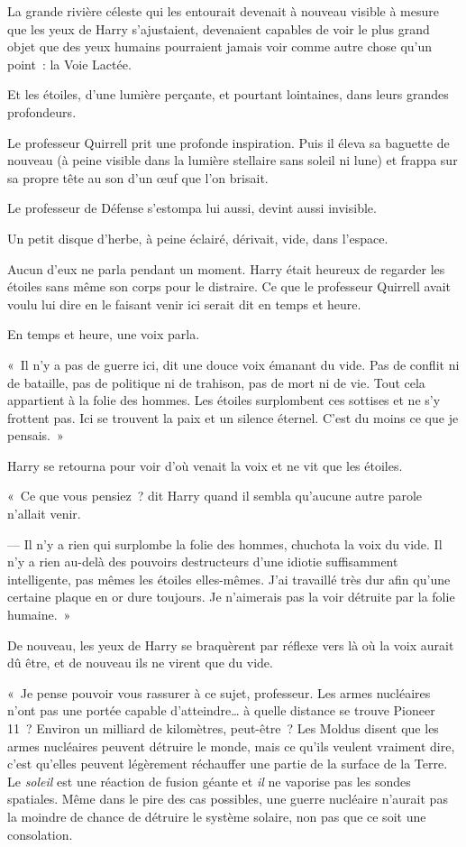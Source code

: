 La grande rivière céleste qui les entourait devenait à nouveau visible à mesure que les yeux de Harry s'ajustaient, devenaient capables de voir le plus grand objet que des yeux humains pourraient jamais voir comme autre chose qu'un point~: la Voie Lactée.

Et les étoiles, d'une lumière perçante, et pourtant lointaines, dans leurs grandes profondeurs.

Le professeur Quirrell prit une profonde inspiration. Puis il éleva sa baguette de nouveau (à peine visible dans la lumière stellaire sans soleil ni lune) et frappa sur sa propre tête au son d'un œuf que l'on brisait.

Le professeur de Défense s'estompa lui aussi, devint aussi invisible.

Un petit disque d'herbe, à peine éclairé, dérivait, vide, dans l'espace.

Aucun d'eux ne parla pendant un moment. Harry était heureux de regarder les étoiles sans même son corps pour le distraire. Ce que le professeur Quirrell avait voulu lui dire en le faisant venir ici serait dit en temps et heure.

En temps et heure, une voix parla.

«~Il n'y a pas de guerre ici, dit une douce voix émanant du vide. Pas de conflit ni de bataille, pas de politique ni de trahison, pas de mort ni de vie. Tout cela appartient à la folie des hommes. Les étoiles surplombent ces sottises et ne s'y frottent pas. Ici se trouvent la paix et un silence éternel. C'est du moins ce que je pensais.~»

Harry se retourna pour voir d'où venait la voix et ne vit que les étoiles.

«~Ce que vous pensiez~? dit Harry quand il sembla qu'aucune autre parole n'allait venir.

--- Il n'y a rien qui surplombe la folie des hommes, chuchota la voix du vide. Il n'y a rien au-delà des pouvoirs destructeurs d'une idiotie suffisamment intelligente, pas mêmes les étoiles elles-mêmes. J'ai travaillé très dur afin qu'une certaine plaque en or dure toujours. Je n'aimerais pas la voir détruite par la folie humaine.~»

De nouveau, les yeux de Harry se braquèrent par réflexe vers là où la voix aurait dû être, et de nouveau ils ne virent que du vide.

«~Je pense pouvoir vous rassurer à ce sujet, professeur. Les armes nucléaires n'ont pas une portée capable d'atteindre… à quelle distance se trouve Pioneer 11~? Environ un milliard de kilomètres, peut-être~? Les Moldus disent que les armes nucléaires peuvent détruire le monde, mais ce qu'ils veulent vraiment dire, c'est qu'elles peuvent légèrement réchauffer une partie de la surface de la Terre. Le \emph{soleil} est une réaction de fusion géante et \emph{il} ne vaporise pas les sondes spatiales. Même dans le pire des cas possibles, une guerre nucléaire n'aurait pas la moindre de chance de détruire le système solaire, non pas que ce soit une consolation.


